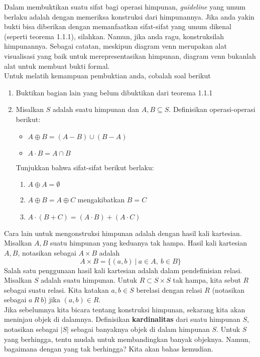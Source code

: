 	Dalam membuktikan suatu sifat bagi operasi himpunan, \textit{guideline} yang umum berlaku adalah dengan memeriksa konstruksi dari himpunannya. Jika anda yakin bukti bisa diberikan dengan memanfaatkan sifat-sifat yang umum dikenal (seperti teorema 1.1.1), silahkan. Namun, jika anda ragu, konstruksilah himpunannya. Sebagai catatan, meskipun diagram venn merupakan alat visualisasi yang baik untuk merepresentasikan himpunan, diagram venn bukanlah alat untuk membuat bukti formal.
	\\
	
	Untuk melatih kemampuan pembuktian anda, cobalah soal berikut
	\begin{enumerate}
		\item Buktikan bagian lain yang belum dibuktikan dari teorema 1.1.1
		\item Misalkan $S$ adalah suatu himpunan dan $A,B \subseteq S$. Definisikan operasi-operasi berikut:
		\begin{itemize}
			\item $A \oplus B = (A-B) \cup (B-A)$
			\item $A \cdot B = A \cap B$
		\end{itemize}
		Tunjukkan bahwa sifat-sifat berikut berlaku:
		\begin{enumerate}
			\item $A \oplus A = \emptyset$
			\item $A \oplus B = A \oplus C$ mengakibatkan $B = C$
			\item $A \cdot (B + C) = (A \cdot B) + (A \cdot C)$
		\end{enumerate}
	\end{enumerate}
	Cara lain untuk mengonstruksi himpunan adalah dengan hasil kali kartesian. Misalkan $A,B$ suatu himpunan yang keduanya tak hampa. Hasil kali kartesian $A,B$, notasikan sebagai $A \times B$ adalah
	$$A \times B = \{ (a,b) \ | \ a \in A,\ b \in B \}$$
	Salah satu penggunaan hasil kali kartesian adalah dalam pendefinisian relasi. Misalkan $S$ adalah suatu himpunan. Untuk $R \subset S \times S$ tak hampa, kita sebut $R$ sebagai suatu relasi. Kita katakan $a,b \in S$ berelasi dengan relasi $R$ (notasikan sebagai $a \ R \ b$) jika $(a,b) \in R$.
	\\
	
	Jika sebelumnya kita bicara tentang konstruksi himpunan, sekarang kita akan meninjau objek di dalamnya. Definisikan \textbf{kardinalitas} dari suatu himpunan $S$, notasikan sebagai $|S|$ sebagai banyaknya objek di dalam himpunan $S$. Untuk $S$ yang berhingga, tentu mudah untuk membandingkan banyak objeknya. Namun, bagaimana dengan yang tak berhingga? Kita akan bahas kemudian.
